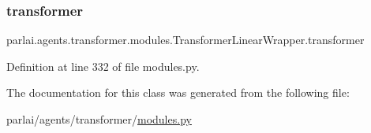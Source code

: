\subsubsection{\texorpdfstring{transformer}{transformer}}
{\footnotesize\ttfamily parlai.\+agents.\+transformer.\+modules.\+Transformer\+Linear\+Wrapper.\+transformer}



Definition at line 332 of file modules.\+py.



The documentation for this class was generated from the following file\+:\begin{DoxyCompactItemize}
\item 
parlai/agents/transformer/\hyperlink{parlai_2agents_2transformer_2modules_8py}{modules.\+py}\end{DoxyCompactItemize}
